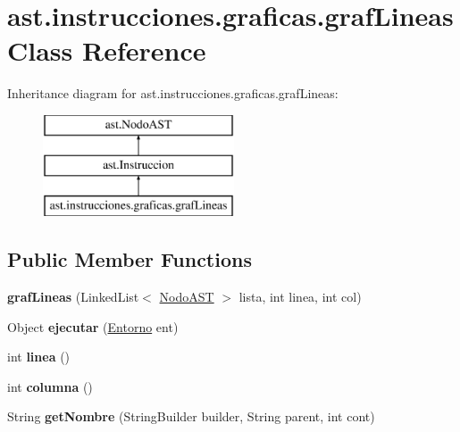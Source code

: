\hypertarget{classast_1_1instrucciones_1_1graficas_1_1graf_lineas}{}\section{ast.\+instrucciones.\+graficas.\+graf\+Lineas Class Reference}
\label{classast_1_1instrucciones_1_1graficas_1_1graf_lineas}
Inheritance diagram for ast.\+instrucciones.\+graficas.\+graf\+Lineas\+:\begin{figure}[H]
\begin{center}
\leavevmode
\includegraphics[height=3.000000cm]{classast_1_1instrucciones_1_1graficas_1_1graf_lineas}
\end{center}
\end{figure}
\subsection*{Public Member Functions}
\begin{DoxyCompactItemize}
\item 
\mbox{\label{classast_1_1instrucciones_1_1graficas_1_1graf_lineas_a14ab6b521856c0c935c3a57dff020936}} 
{\bfseries graf\+Lineas} (Linked\+List$<$ \mbox{\hyperlink{interfaceast_1_1_nodo_a_s_t}{Nodo\+A\+ST}} $>$ lista, int linea, int col)
\item 
\mbox{\label{classast_1_1instrucciones_1_1graficas_1_1graf_lineas_aa76cb98a3757b5df941f0220c8f97be9}} 
Object {\bfseries ejecutar} (\mbox{\hyperlink{classentorno_1_1_entorno}{Entorno}} ent)
\item 
\mbox{\label{classast_1_1instrucciones_1_1graficas_1_1graf_lineas_a367d82b82ab29725a6b1df12a089f4f9}} 
int {\bfseries linea} ()
\item 
\mbox{\label{classast_1_1instrucciones_1_1graficas_1_1graf_lineas_a8250ad820ec851d559cf4c93f67cd6e9}} 
int {\bfseries columna} ()
\item 
\mbox{\label{classast_1_1instrucciones_1_1graficas_1_1graf_lineas_a4c4f727dee1fd573d1c6d7f9043f9926}} 
String {\bfseries get\+Nombre} (String\+Builder builder, String parent, int cont)
\end{DoxyCompactItemize}


